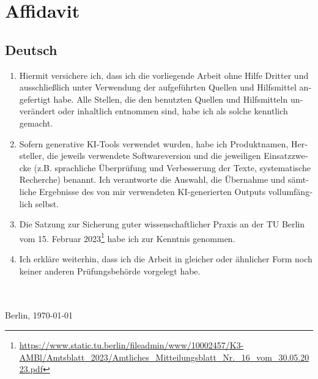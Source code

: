 \chapter*{Affidavit}
\begin{otherlanguage}{ngerman}
\section*{Deutsch}
\begin{enumerate}[noitemsep]
\item Hiermit versichere ich, dass ich die vorliegende Arbeit ohne Hilfe Dritter und ausschlie\ss lich unter Verwendung der aufgef\"uhrten Quellen und Hilfsmittel angefertigt habe. Alle Stellen, die den benutzten Quellen und Hilfsmitteln unver\"andert oder inhaltlich entnommen sind, habe ich als solche kenntlich gemacht.
\item Sofern generative KI-Tools verwendet wurden, habe ich Produktnamen, Hersteller, die jeweils verwendete Softwareversion und die jeweiligen Einsatzzwecke (z.B. sprachliche \"Uberpr\"ufung und Verbesserung der Texte, systematische Recherche) benannt. Ich verantworte die Auswahl, die \"Ubernahme und s\"amtliche Ergebnisse des von mir verwendeten KI-generierten Outputs vollumf\"anglich selbst.
\item Die Satzung zur Sicherung guter wissenschaftlicher Praxis an der TU Berlin vom 15. Februar 2023\footnote{\url{https://www.static.tu.berlin/fileadmin/www/10002457/K3-AMBl/Amtsblatt_2023/Amtliches_Mitteilungsblatt_Nr._16_vom_30.05.2023.pdf}} habe ich zur Kenntnis genommen.
\item Ich erkl\"are weiterhin, dass ich die Arbeit in gleicher oder \"ahnlicher Form noch keiner anderen Pr\"ufungsbeh\"orde vorgelegt habe.
\end{enumerate}
\vspace*{4ex}
\makebox[3in][l]{\hrulefill}\\
\textsc{\autor} \\
Berlin, \today
\end{otherlanguage}
